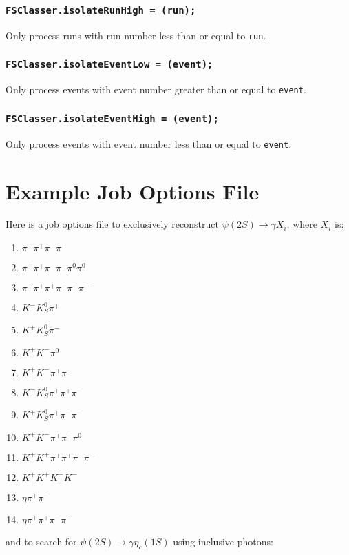 \documentclass[11pt,a4paper]{define/cepcnote}
\begin{document}
\subsubsection{\tt FSClasser.isolateRunHigh = (run);}

Only process runs with run number less than or equal to {\tt run}.

\subsubsection{\tt FSClasser.isolateEventLow = (event);}

Only process events with event number greater than or equal to {\tt event}.

\subsubsection{\tt FSClasser.isolateEventHigh = (event);}

Only process events with event number less than or equal to {\tt event}.


\section{Example Job Options File}
\label{sec:example}

Here is a job options file to exclusively reconstruct $\psi(2S)\to\gamma X_i$, where $X_i$ is:
\begin{enumerate}
\item{$\pi^+\pi^+\pi^-\pi^-$}
\item{$\pi^+\pi^+\pi^-\pi^-\pi^0\pi^0$}
\item{$\pi^+\pi^+\pi^+\pi^-\pi^-\pi^-$}
\item{$K^-K^0_S\pi^+$}
\item{$K^+K^0_S\pi^-$}
\item{$K^+K^-\pi^0$}
\item{$K^+K^-\pi^+\pi^-$}
\item{$K^-K^0_S\pi^+\pi^+\pi^-$}
\item{$K^+K^0_S\pi^+\pi^-\pi^-$}
\item{$K^+K^-\pi^+\pi^-\pi^0$}
\item{$K^+K^+\pi^+\pi^+\pi^-\pi^-$}
\item{$K^+K^+K^-K^-$}
\item{$\eta\pi^+\pi^-$}
\item{$\eta\pi^+\pi^+\pi^-\pi^-$}
\end{enumerate}
and to search for $\psi(2S)\to\gamma\eta_c(1S)$ using inclusive photons:
\end{document}
